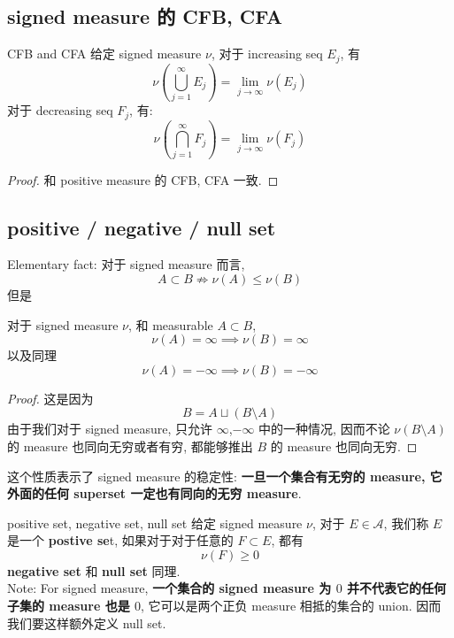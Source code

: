 \documentclass[lang=cn,11pt]{elegantbook}
\begin{document}
\subsection{signed measure 的 CFB, CFA }
\begin{proposition}{CFB and CFA}
给定 signed measure $\nu$,   对于 increasing seq $E_j$, 有 \[
\nu(\bigcup_{j=1}^\infty E_j)  = \lim_{j\to \infty} \nu(E_j) 
\]
对于 decreasing seq $F_j$, 有: \[
\nu(\bigcap_{j=1}^\infty F_j)  = \lim_{j\to \infty} \nu(F_j) 
\]
\end{proposition}
\begin{proof}
    和 positive measure 的 CFB, CFA 一致.
\end{proof}

\subsection{positive / negative / null set}

Elementary fact: 对于 signed measure 而言, \[
A \subset B \not \Longrightarrow \nu(A) \leq \nu (B)
\]
但是
\begin{lemma}
对于 signed measure $\nu$, 和 measurable $A \subset B$, 
\[
\nu(A) = \infty \implies \nu(B) = \infty
\]以及同理 \[
\nu(A) = -\infty \implies \nu(B) = - \infty
\]
\end{lemma}
\begin{proof}
    这是因为 \[
B = A \sqcup (B \setminus A)
\]
由于我们对于 signed measure, 只允许 $\infty$,$-\infty$ 中的一种情况, 因而不论 $\nu(B \setminus A)$ 的 measure 也同向无穷或者有穷, 都能够推出 $B$ 的 measure 也同向无穷.
\end{proof}
\begin{remark}
    这个性质表示了 signed measure 的稳定性: \textbf{一旦一个集合有无穷的 measure, 它外面的任何 superset 一定也有同向的无穷 measure}.
\end{remark}
 

\begin{definition}{positive set, negative set, null set}
    给定 signed measure $\nu$, 对于 $E \in \mathcal{A}$, 我们称 $E$ 是一个 \textbf{postive se}t, 如果对于对于任意的 $F \subset E$, 都有 \[
    \nu(F) \geq 0
    \] \textbf{negative set} 和 \textbf{null set} 同理.\\
Note: For signed measure,\textbf{ 一个集合的 signed measure 为 $0$ 并不代表它的任何子集的 measure 也是 $0$}, 它可以是两个正负 measure 相抵的集合的 union. 因而我们要这样额外定义 null set.
\end{definition}
\end{document}
